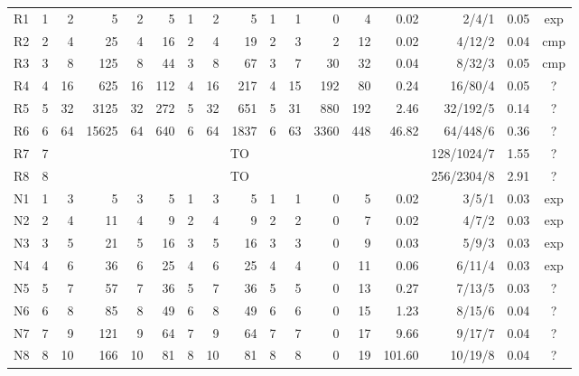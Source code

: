 \begin{table}[t]
\begin{tabular}{@{}lrrrrrrrrrrrrrrrc@{}}
R1 & 1 & 2 & 5 & 2 & 5 & 1 & 2 & 5 & 1 & 1 & 0 & 4 & 0.02 & 2/4/1 & 0.05 & exp\\
R2 & 2 & 4 & 25 & 4 & 16 & 2 & 4 & 19 & 2 & 3 & 2 & 12 & 0.02 & 4/12/2 & 0.04 & cmp\\
R3 & 3 & 8 & 125 & 8 & 44 & 3 & 8 & 67 & 3 & 7 & 30 & 32 & 0.04 & 8/32/3 & 0.05 & cmp\\
R4 & 4 & 16 & 625 & 16 & 112 & 4 & 16 & 217 & 4 & 15 & 192 & 80 & 0.24 & 16/80/4 & 0.05 & ?\\
R5 & 5 & 32 & 3125 & 32 & 272 & 5 & 32 & 651 & 5 & 31 & 880 & 192 & 2.46 & 32/192/5 & 0.14 & ?\\
R6 & 6 & 64 & 15625 & 64 & 640 & 6 & 64 & 1837 & 6 & 63 & 3360 & 448 & 46.82 & 64/448/6 & 0.36 & ?\\
R7 & 7 & \multicolumn{12}{c}{TO} & 128/1024/7 & 1.55 & ?\\
R8 & 8 & \multicolumn{12}{c}{TO} & 256/2304/8 & 2.91 & ?\\
N1 & 1 & 3 & 5 & 3 & 5 & 1 & 3 & 5 & 1 & 1 & 0 & 5 & 0.02 & 3/5/1 & 0.03 & exp\\
N2 & 2 & 4 & 11 & 4 & 9 & 2 & 4 & 9 & 2 & 2 & 0 & 7 & 0.02 & 4/7/2 & 0.03 & exp\\
N3 & 3 & 5 & 21 & 5 & 16 & 3 & 5 & 16 & 3 & 3 & 0 & 9 & 0.03 & 5/9/3 & 0.03 & exp\\
N4 & 4 & 6 & 36 & 6 & 25 & 4 & 6 & 25 & 4 & 4 & 0 & 11 & 0.06 & 6/11/4 & 0.03 & exp\\
N5 & 5 & 7 & 57 & 7 & 36 & 5 & 7 & 36 & 5 & 5 & 0 & 13 & 0.27 & 7/13/5 & 0.03 & ?\\
N6 & 6 & 8 & 85 & 8 & 49 & 6 & 8 & 49 & 6 & 6 & 0 & 15 & 1.23 & 8/15/6 & 0.04 & ?\\
N7 & 7 & 9 & 121 & 9 & 64 & 7 & 9 & 64 & 7 & 7 & 0 & 17 & 9.66 & 9/17/7 & 0.04 & ?\\
N8 & 8 & 10 & 166 & 10 & 81 & 8 & 10 & 81 & 8 & 8 & 0 & 19 & 101.60 & 10/19/8 & 0.04 & ?\\
\bottomrule
\end{tabular}
\end{table}
